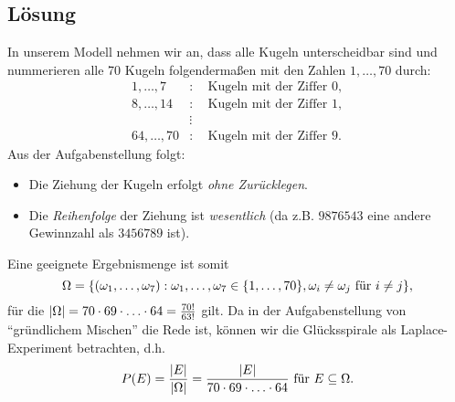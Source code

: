 \documentclass{exercise}
\begin{document}
    \subsection*{Lösung}
    In unserem Modell nehmen wir an, dass alle Kugeln unterscheidbar sind und nummerieren alle 70 Kugeln folgendermaßen mit den Zahlen \(1, \ldots, 70\) durch:
    \begin{align*}
        1, \ldots, 7&: \quad \text{Kugeln mit der Ziffer }0,\\
        8, \ldots, 14&: \quad \text{Kugeln mit der Ziffer }1,\\
        &\vdots\\
        64, \ldots, 70&: \quad \text{Kugeln mit der Ziffer }9.
    \end{align*}
    Aus der Aufgabenstellung folgt:
    \begin{itemize}
        \item Die Ziehung der Kugeln erfolgt \emph{ohne Zurücklegen}.
        \item Die \emph{Reihenfolge} der Ziehung ist \emph{wesentlich} (da z.B. \(9876543\) eine andere Gewinnzahl als \(3456789\) ist).
    \end{itemize}
    Eine geeignete Ergebnismenge ist somit
    \[
        \Omega = \braces*{\parentheses*{\omega_1, \ldots, \omega_7} : \omega_1, \ldots, \omega_7 \in \braces*{1, \ldots, 70}, \omega_i \ne \omega_j\text{ für }i \ne j},
    \]
    für die \(\absolute*{\Omega} = 70 \cdot 69 \cdot \ldots \cdot 64 = \frac{70!}{63!}\) gilt.
    Da in der Aufgabenstellung von ``gründlichem Mischen'' die Rede ist, können wir die Glücksspirale als Laplace-Experiment betrachten, d.h.
    \[
        P\parentheses*{E} = \frac{\absolute*{E}}{\absolute*{\Omega}} = \frac{\absolute*{E}}{70 \cdot 69 \cdot \ldots \cdot 64}\text{ für }E \subseteq \Omega.
    \]
\end{document}
